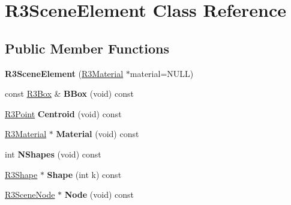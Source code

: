 \hypertarget{class_r3_scene_element}{}\section{R3\+Scene\+Element Class Reference}
\label{class_r3_scene_element}
\subsection*{Public Member Functions}
\begin{DoxyCompactItemize}
\item 
{\bfseries R3\+Scene\+Element} (\hyperlink{class_r3_material}{R3\+Material} $\ast$material=N\+U\+LL)\hypertarget{class_r3_scene_element_a130b03ed6923205ee91c68bb14d8d75d}{}\label{class_r3_scene_element_a130b03ed6923205ee91c68bb14d8d75d}

\item 
const \hyperlink{class_r3_box}{R3\+Box} \& {\bfseries B\+Box} (void) const \hypertarget{class_r3_scene_element_a35aa0e6e58c9adce126495f1403091a4}{}\label{class_r3_scene_element_a35aa0e6e58c9adce126495f1403091a4}

\item 
\hyperlink{class_r3_point}{R3\+Point} {\bfseries Centroid} (void) const \hypertarget{class_r3_scene_element_ad2a5dc84a9da4e193ef28918e56bd23a}{}\label{class_r3_scene_element_ad2a5dc84a9da4e193ef28918e56bd23a}

\item 
\hyperlink{class_r3_material}{R3\+Material} $\ast$ {\bfseries Material} (void) const \hypertarget{class_r3_scene_element_a93f7164f40e497e9ac102b6d1fca9aee}{}\label{class_r3_scene_element_a93f7164f40e497e9ac102b6d1fca9aee}

\item 
int {\bfseries N\+Shapes} (void) const \hypertarget{class_r3_scene_element_ae306685714a1170e699999885f5245b6}{}\label{class_r3_scene_element_ae306685714a1170e699999885f5245b6}

\item 
\hyperlink{class_r3_shape}{R3\+Shape} $\ast$ {\bfseries Shape} (int k) const \hypertarget{class_r3_scene_element_a591ffffb56fedad88889e15558522802}{}\label{class_r3_scene_element_a591ffffb56fedad88889e15558522802}

\item 
\hyperlink{class_r3_scene_node}{R3\+Scene\+Node} $\ast$ {\bfseries Node} (void) const \hypertarget{class_r3_scene_element_ac88008a72e3f7031f3adb35380afcb87}{}\label{class_r3_scene_element_ac88008a72e3f7031f3adb35380afcb87}


\end{DoxyCompactItemize}
